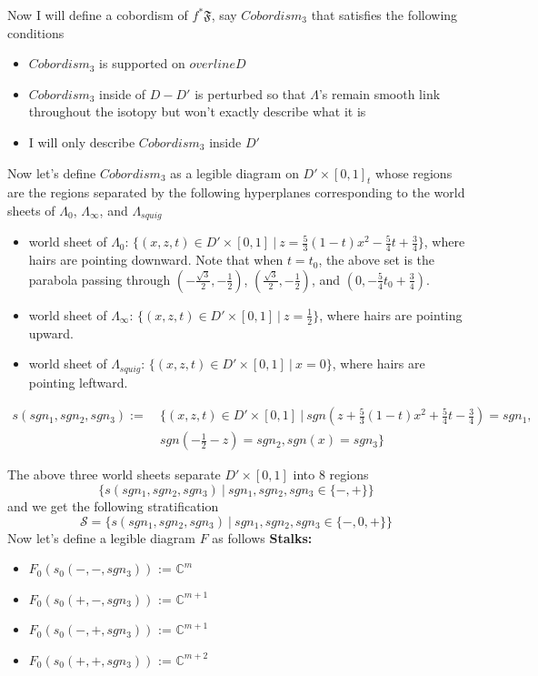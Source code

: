Now I will define a cobordism of $f^*\mathfrak{F}$, say $Cobordism_3$ that satisfies the following conditions
\begin{itemize}
\item $Cobordism_3$ is supported on $overline{D}$

\item $Cobordism_3$ inside of $D-D'$ is perturbed so that $\Lambda$'s remain smooth link throughout the isotopy but won't exactly describe what it is

\item I will only describe $Cobordism_3$ inside $D'$
\end{itemize}
Now let's define $Cobordism_3$ as a legible diagram on $D'\times [0,1]_t$ whose regions are the regions separated by the following hyperplanes corresponding to the world sheets of $\Lambda_0$, $\Lambda_\infty$, and $\Lambda_{squig}$
\begin{itemize}
\item world sheet of $\Lambda_0$: 
$\{(x,z,t) \in D' \times [0,1] ~|~ z=\frac{5}{3}(1-t)x^2 - \frac{5}{4}t+\frac{3}{4}\}$, where hairs are pointing downward. Note that when $t=t_0$, the above set is the parabola passing through $(-\frac{\sqrt{3}}{2}, -\frac{1}{2})$, $(\frac{\sqrt{3}}{2}, -\frac{1}{2})$, and $(0,-\frac{5}{4}t_0 + \frac{3}{4})$.

\item world sheet of $\Lambda_\infty$: 
$\{(x,z,t) \in D' \times [0,1] ~|~ z=\frac{1}{2} \}$, where hairs are pointing upward.

\item world sheet of $\Lambda_{squig}$:
$\{(x,z,t) \in D' \times [0,1] ~|~ x=0 \}$, where hairs are pointing leftward.
\end{itemize}
\begin{definition}
\begin{align*}
s(sgn_1,sgn_2,sgn_3) :=~ &\{(x,z,t) \in D' \times [0,1] ~|~ sgn(z+\frac{5}{3}(1-t)x^2+\frac{5}{4}t-\frac{3}{4}) = sgn_1, \\
& sgn(-\frac{1}{2}-z)=sgn_2,sgn(x)=sgn_3
	\}
\end{align*}
\end{definition}
The above three world sheets separate $D'\times [0,1]$ into $8$ regions
\[
	\{s(sgn_1,sgn_2,sgn_3) ~|~ sgn_1,sgn_2,sgn_3 \in \{-,+\}\}
\]
and we get the following stratification
\[
	\mathcal{S} = \{ s(sgn_1,sgn_2,sgn_3) ~|~ sgn_1,sgn_2, sgn_3 \in \{-,0,+\} \}
\]
Now let's define a legible diagram $F$ as follows
\textbf{Stalks:}
\begin{itemize}
\item $F_0(s_0(-,-,sgn_3))$ := $\mathbb{C}^{m}$
\item $F_0(s_0(+,-,sgn_3))$ := $\mathbb{C}^{m+1}$
\item $F_0(s_0(-,+,sgn_3))$ := $\mathbb{C}^{m+1}$
\item $F_0(s_0(+,+,sgn_3))$ := $\mathbb{C}^{m+2}$
\end{itemize}

